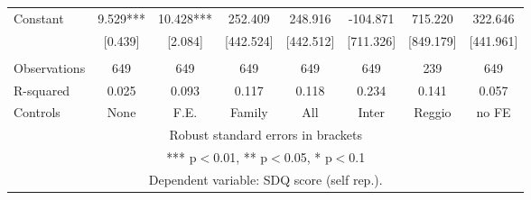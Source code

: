 \begin{tabular}{lccccccc}
Constant & 9.529*** & 10.428*** & 252.409 & 248.916 & -104.871 & 715.220 & 322.646 \\
 & [0.439] & [2.084] & [442.524] & [442.512] & [711.326] & [849.179] & [441.961] \\
 &  &  &  &  &  &  &  \\
Observations & 649 & 649 & 649 & 649 & 649 & 239 & 649 \\
R-squared & 0.025 & 0.093 & 0.117 & 0.118 & 0.234 & 0.141 & 0.057 \\
 Controls & None & F.E. & Family & All & Inter & Reggio & no FE \\ \hline
\multicolumn{8}{c}{ Robust standard errors in brackets} \\
\multicolumn{8}{c}{ *** p$<$0.01, ** p$<$0.05, * p$<$0.1} \\
\multicolumn{8}{c}{ Dependent variable: SDQ score (self rep.).} \\
\end{tabular}
